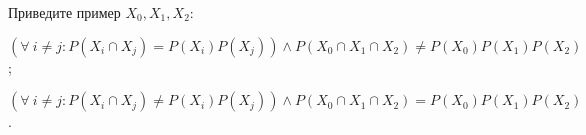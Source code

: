Приведите пример $X_0, X_1, X_2$:
\begin{enumcyr}
    \item $\left( \forall~ i \neq j: P(X_i \cap X_j) = P(X_i) P(X_j) \right) \land P(X_0 \cap X_1 \cap
        X_2) \neq P(X_0) P(X_1) P(X_2)$;
    \item $\left( \forall~ i \neq j: P(X_i \cap X_j) \neq P(X_i) P(X_j) \right) \land P(X_0 \cap X_1 \cap
        X_2) = P(X_0) P(X_1) P(X_2)$.
\end{enumcyr}